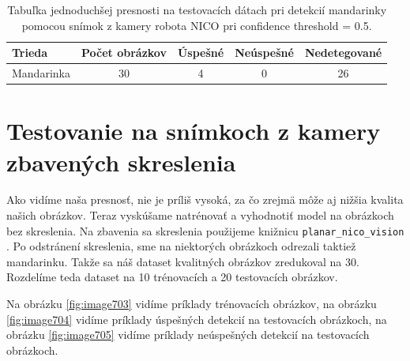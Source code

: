 \begin{table}[H]
\begin{tabular}{|l|c|c|c|c|}
\hline
\textbf{Trieda} & \textbf{Počet obrázkov} & \textbf{Úspešné} & \textbf{Neúspešné} &  \textbf{Nedetegované}\\
\hline
Mandarinka & 30 & 4 & 0 & 26 \\
\hline
\end{tabular}
\centering
\caption{Tabuľka jednoduchšej presnosti na testovacích dátach pri detekcií mandarinky pomocou snímok z kamery robota NICO pri confidence threshold = 0.5.}
\label{tab:table702}
\end{table}

\section{Testovanie na snímkoch z kamery zbavených skreslenia}

Ako vidíme naša presnosť, nie je príliš vysoká, za čo zrejmä môže aj nižšia kvalita našich obrázkov. Teraz vyskúšame natrénovať a vyhodnotiť model na obrázkoch bez skreslenia. Na zbavenia sa skreslenia použijeme knižnicu \texttt{planar\_nico\_vision} \cite{planarNicoVision}. Po odstránení skreslenia, sme na niektorých obrázkoch odrezali taktiež mandarinku. Takže sa náš dataset kvalitných obrázkov zredukoval na 30. Rozdelíme teda dataset na 10 trénovacích a 20 testovacích obrázkov. 

Na obrázku \ref{fig:image703} vidíme príklady trénovacích obrázkov, na obrázku \ref{fig:image704} vidíme príklady úspešných detekcií na testovacích obrázkoch, na obrázku \ref{fig:image705} vidíme príklady neúspešných detekcií na testovacích obrázkoch.

